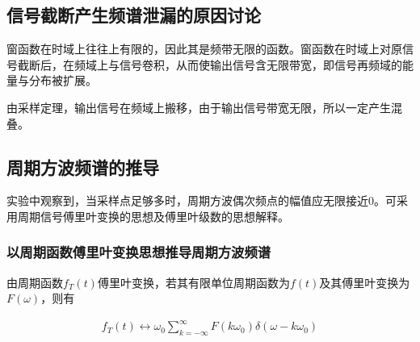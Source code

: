 \documentclass[12pt]{article}
\begin{document}
\subsection{信号截断产生频谱泄漏的原因讨论}
窗函数在时域上往往上有限的，因此其是频带无限的函数。窗函数在时域上对原信号截断后，在频域上与信号卷积，从而使输出信号含无限带宽，即信号再频域的能量与分布被扩展。

由采样定理，输出信号在频域上搬移，由于输出信号带宽无限，所以一定产生混叠。





\subsection{周期方波频谱的推导}
实验中观察到，当采样点足够多时，周期方波偶次频点的幅值应无限接近0。可采用周期信号傅里叶变换的思想及傅里叶级数的思想解释。
\subsubsection{以周期函数傅里叶变换思想推导周期方波频谱}
由周期函数$f_T(t)$傅里叶变换，若其有限单位周期函数为$f(t)$及其傅里叶变换为$F(\omega)$，则有
\begin{center}
    {\setlength\abovedisplayskip{-0.8cm}
    \setlength\belowdisplayskip{-0.2cm}
    \begin{equation}
        \begin{aligned}
            f_T(t)\longleftrightarrow \omega_0 \sum_{k=-\infty}^{\infty}F(k\omega_0)\delta(\omega-k\omega_0)\\
        \end{aligned}
    \end{equation}
    }
\label{Fourier_periodic}
\end{center}
\end{document}

